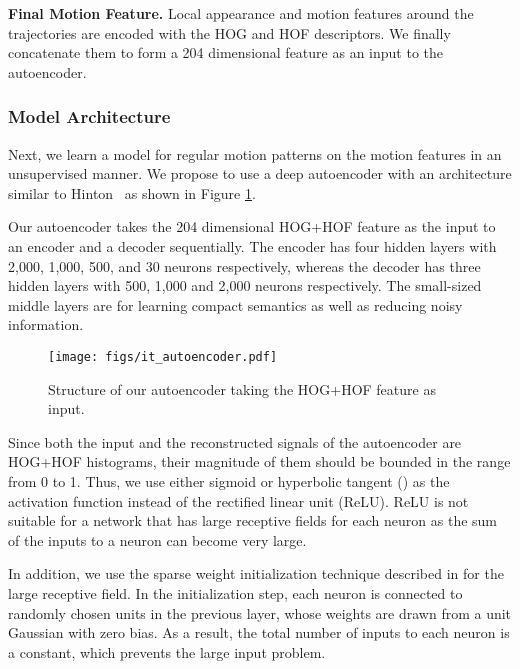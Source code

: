 \documentclass[10pt,twocolumn,letterpaper]{article}
\begin{document}
\vspace{.5em}
\noindent \textbf{Final Motion Feature.}
Local appearance and motion features around the trajectories are encoded with the HOG and HOF descriptors. 
We finally concatenate them to form a 204 dimensional feature as an input to the autoencoder.





\subsubsection{Model Architecture}

Next, we learn a model for regular motion patterns on the motion features in an unsupervised manner. 
We propose to use a deep autoencoder with an architecture similar to Hinton\etal~ \cite{hinton2006reducing} as shown in Figure \ref{fig:it_auto}. 

Our autoencoder takes the 204 dimensional HOG+HOF feature as the input to an encoder and a decoder sequentially. 
The encoder has four hidden layers with 2,000, 1,000, 500, and 30 neurons respectively, whereas the decoder has three hidden layers with 500, 1,000 and 2,000 neurons respectively.
The small-sized middle layers are for learning compact semantics as well as reducing noisy information.

\begin{figure}[h]
	\centering
	\texttt{[image: figs/it\_autoencoder.pdf]}
	\caption{Structure of our autoencoder taking the HOG+HOF feature as input.}
	\vspace{-2mm}
	\label{fig:it_auto}
\end{figure}

Since both the input and the reconstructed signals of the autoencoder are HOG+HOF histograms, their magnitude of them should be bounded in the range from 0 to 1. 
Thus, we use either sigmoid or hyperbolic tangent () as the activation function instead of the rectified linear unit (ReLU). ReLU is not suitable for a network that has large receptive fields for each neuron as the sum of the inputs to a neuron can become very large.

In addition, we use the sparse weight initialization technique described in \cite{sutskever2013importance} for the large receptive field. 
In the initialization step, each neuron is connected to  randomly chosen units in the previous layer, whose weights are drawn from a unit Gaussian with zero bias.
As a result, the total number of inputs to each neuron is a constant, which prevents the large input problem.
\end{document}
